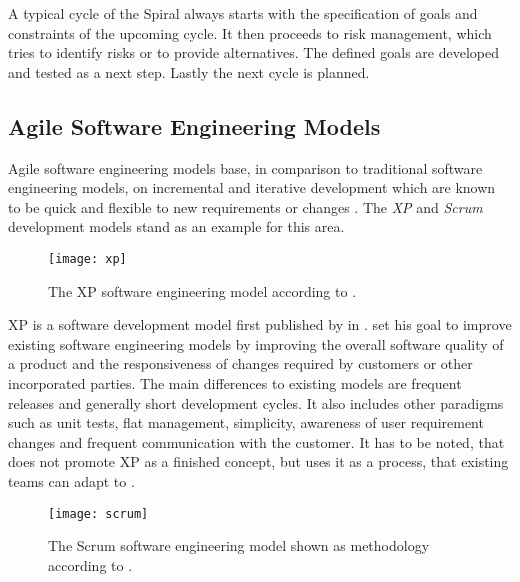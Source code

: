 A typical cycle of the Spiral always starts with the specification of goals and
constraints of the upcoming cycle. It then proceeds to risk management, which
tries to identify risks or to provide alternatives. The defined goals are
developed and tested as a next step. Lastly the next cycle is planned.


\subsection{Agile Software Engineering Models} %

Agile software engineering models base, in comparison to traditional software
engineering models, on incremental and iterative development which are known to
be quick and flexible to new requirements or changes \cite{Beck1999}. The
\emph{\acl{XP}} and \emph{Scrum} development models stand as an example for
this area.

\begin{figure}[htbp]
  \centering
  \texttt{[image: xp]}
  \caption[\acl{XP} Model]
  {The \acl{XP} software engineering model according to \textcite{Beck1999a}.}
\end{figure}

\ac{XP} is a software development model first published by
\citeauthor{Beck1999} \cite{Beck1999a} in \citeyear{Beck1999}.
\citeauthor{Beck1999} set his goal to improve existing software engineering
models by improving the overall software quality of a product and the
responsiveness of changes required by customers or other incorporated parties.
The main differences to existing models are frequent releases and generally
short development cycles. It also includes other paradigms such as unit tests,
flat management, simplicity, awareness of user requirement changes and frequent
communication with the customer. It has to be noted, that \citeauthor{Beck1999}
does not promote \acl{XP} as a finished concept, but uses it as a process, that
existing teams can adapt to \cite{Beck1999}.

\begin{figure}[htbp]
  \centering
  \texttt{[image: scrum]}
  \caption[Scrum Model]
  {The Scrum software engineering model shown as methodology according to
    \textcite{Schwaber1995}.}
\end{figure}

